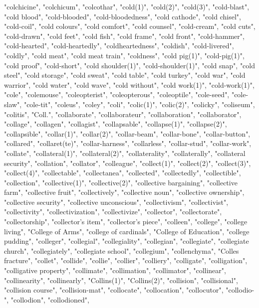 "colchicine",
"colchicum",
"colcothar",
"cold(1)",
"cold(2)",
"cold(3)",
"cold-blast",
"cold blood",
"cold-blooded",
"cold-bloodedness",
"cold cathode",
"cold chisel",
"cold-coil",
"cold colours",
"cold comfort",
"cold counsel",
"cold-cream",
"cold cuts",
"cold-drawn",
"cold feet",
"cold fish",
"cold frame",
"cold front",
"cold-hammer",
"cold-hearted",
"cold-heartedly",
"coldheartedness",
"coldish",
"cold-livered",
"coldly",
"cold meat",
"cold meat train",
"coldness",
"cold pig(1)",
"cold-pig(1)",
"cold proof",
"cold-short",
"cold shoulder(1)",
"cold-shoulder(1)",
"cold snap",
"cold steel",
"cold storage",
"cold sweat",
"cold table",
"cold turkey",
"cold war",
"cold warrior",
"cold water",
"cold wave",
"cold without",
"cold work(1)",
"cold-work(1)",
"cole",
"colemouse",
"coleopterist",
"coleopterous",
"coleoptile",
"cole-seed",
"cole-slaw",
"cole-tit",
"coleus",
"coley",
"coli",
"colic(1)",
"colic(2)",
"colicky",
"coliseum",
"colitis",
"Coll.",
"collaborate",
"collaborateur",
"collaboration",
"collaborator",
"collage",
"collagen",
"collagist",
"collapsable",
"collapse(1)",
"collapse(2)",
"collapsible",
"collar(1)",
"collar(2)",
"collar-beam",
"collar-bone",
"collar-button",
"collared",
"collaret(te)",
"collar-harness",
"collarless",
"collar-stud",
"collar-work",
"collate",
"collateral(1)",
"collateral(2)",
"collaterality",
"collaterally",
"collateral security",
"collation",
"collator",
"colleague",
"collect(1)",
"collect(2)",
"collect(3)",
"collect(4)",
"collectable",
"collectanea",
"collected",
"collectedly",
"collectible",
"collection",
"collective(1)",
"collective(2)",
"collective bargaining",
"collective farm",
"collective fruit",
"collectively",
"collective noun",
"collective ownership",
"collective security",
"collective unconscious",
"collectivism",
"collectivist",
"collectivity",
"collectivization",
"collectivize",
"collector",
"collectorate",
"collectorship",
"collector's item",
"collector's piece",
"colleen",
"college",
"college living",
"College of Arms",
"college of cardinals",
"College of Education",
"college pudding",
"colleger",
"collegial",
"collegiality",
"collegian",
"collegiate",
"collegiate church",
"collegiately",
"collegiate school",
"collegium",
"collenchyma",
"Colles fracture",
"collet",
"collide",
"collie",
"collier",
"colliery",
"colligate",
"colligation",
"colligative property",
"collimate",
"collimation",
"collimator",
"collinear",
"collinearity",
"collinearly",
"Collins(1)",
"Collins(2)",
"collision",
"collisional",
"collision course",
"collision-mat",
"collocate",
"collocation",
"collocutor",
"collodio-",
"collodion",
"collodioned",
